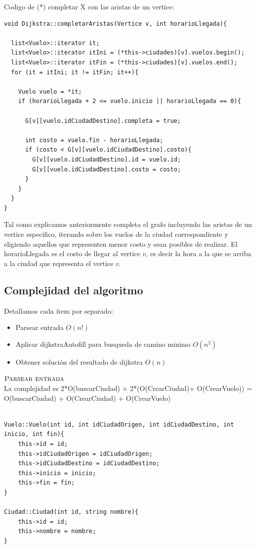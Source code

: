 \noindent
Codigo de (*) completar X con las aristas de un vertice:

\begin{lstlisting}
void Dijkstra::completarAristas(Vertice v, int horarioLlegada){

  list<Vuelo>::iterator it;
  list<Vuelo>::iterator itIni = (*this->ciudades)[v].vuelos.begin();
  list<Vuelo>::iterator itFin = (*this->ciudades)[v].vuelos.end();
  for (it = itIni; it != itFin; it++){
    
    Vuelo vuelo = *it;
    if (horarioLlegada + 2 <= vuelo.inicio || horarioLlegada == 0){

      G[v][vuelo.idCiudadDestino].completa = true;

      int costo = vuelo.fin - horarioLlegada;
      if (costo < G[v][vuelo.idCiudadDestino].costo){
        G[v][vuelo.idCiudadDestino].id = vuelo.id;
        G[v][vuelo.idCiudadDestino].costo = costo;
      }
    }
  }
}
\end{lstlisting}

\noindent
Tal como explicamos anteriormente completa el grafo incluyendo las aristas de un vertice especifico, iterando sobre los vuelos de la ciudad correspondiente y eligiendo aquellos que representen menor costo y sean posibles de realizar. El horarioLlegada es el costo de llegar al vertice $v$, es decir la hora a la que se arriba a la ciudad que representa el vertice $v$.
\bigskip

\subsection{Complejidad del algoritmo}

Detallamos cada item por separado:

\begin{itemize}
\item Parsear entrada $O(n!)$
\item Aplicar dijkstraAutofill para busqueda de camino minimo $O(n^2)$
\item Obtener soluci\'on del resultado de dijkstra $O(n)$
\end{itemize}


\noindent
$\textnormal{\scshape Parsear entrada}$ \\
La complejidad es 2*O(buscarCiudad) + 2*(O(CrearCiudad)+ O(CrearVuelo)) = O(buscarCiudad) + O(CrearCiudad) + O(CrearVuelo)


\begin{lstlisting}

Vuelo::Vuelo(int id, int idCiudadOrigen, int idCiudadDestino, int inicio, int fin){
	this->id = id;
	this->idCiudadOrigen = idCiudadOrigen;
	this->idCiudadDestino = idCiudadDestino;
	this->inicio = inicio;
	this->fin = fin;
}

Ciudad::Ciudad(int id, string nombre){
	this->id = id;
	this->nombre = nombre;
}

\end{lstlisting}

